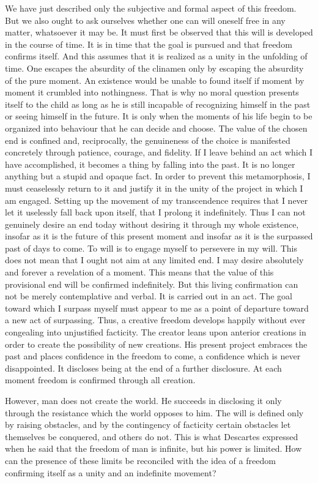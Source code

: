 \documentclass[11pt]{article}
\begin{document}
We have just described only the subjective and formal aspect of this freedom. But we also ought to ask ourselves whether one can will oneself free in any matter, whatsoever it may be. It must first be observed that this will is developed in the course of time. It is in time that the goal is pursued and that freedom confirms itself. And this assumes that it is realized as a unity in the unfolding of time. One escapes the absurdity of the clinamen only by escaping the absurdity of the pure moment. An existence would be unable to found itself if moment by moment it crumbled into nothingness. That is why no moral question presents itself to the child as long as he is still incapable of recognizing himself in the past or seeing himself in the future. It is only when the moments of his life begin to be organized into behaviour that he can decide and choose. The value of the chosen end is confined and, reciprocally, the genuineness of the choice is manifested concretely through patience, courage, and fidelity. If I leave behind an act which I have accomplished, it becomes a thing by falling into the past. It is no longer anything but a stupid and opaque fact. In order to prevent this metamorphosis, I must ceaselessly return to it and justify it in the unity of the project in which I am engaged. Setting up the movement of my transcendence requires that I never let it uselessly fall back upon itself, that I prolong it indefinitely. Thus I can not genuinely desire an end today without desiring it through my whole existence, insofar as it is the future of this present moment and insofar as it is the surpassed past of days to come. To will is to engage myself to persevere in my will. This does not mean that I ought not aim at any limited end. I may desire absolutely and forever a revelation of a moment. This means that the value of this provisional end will be confirmed indefinitely. But this living confirmation can not be merely contemplative and verbal. It is carried out in an act. The goal toward which I surpass myself must appear to me as a point of departure toward a new act of surpassing. Thus, a creative freedom develops happily without ever congealing into unjustified facticity. The creator leans upon anterior creations in order to create the possibility of new creations. His present project embraces the past and places confidence in the freedom to come, a confidence which is never disappointed. It discloses being at the end of a further disclosure. At each moment freedom is confirmed through all creation.

However, man does not create the world. He succeeds in disclosing it only through the resistance which the world opposes to him. The will is defined only by raising obstacles, and by the contingency of facticity certain obstacles let themselves be conquered, and others do not. This is what Descartes expressed when he said that the freedom of man is infinite, but his power is limited. How can the presence of these limits be reconciled with the idea of a freedom confirming itself as a unity and an indefinite movement?
\end{document}
